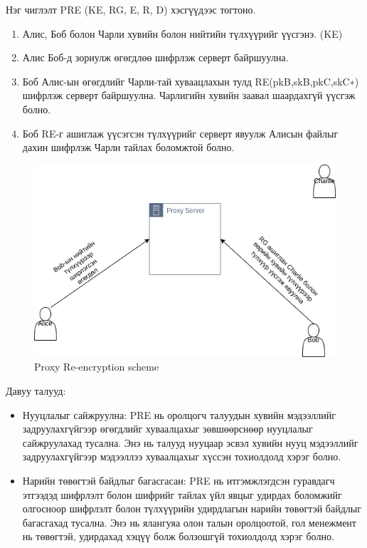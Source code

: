 Нэг чиглэлт PRE (KE, RG, E, R, D) хэсгүүдээс тогтоно.

\begin{enumerate}
    \item Алис, Боб болон Чарли хувийн болон нийтийн түлхүүрийг үүсгэнэ. (KE)
    \item Алис Боб-д зориулж өгөгдлөө шифрлэж серверт байршуулна.
    \item Боб Алис-ын өгөгдлийг Чарли-тай хуваацлахын тулд RE(pkB,skB,pkC,skC∗) шифрлэж серверт байршуулна. Чарлигийн хувийн заавал шаардахгүй үүсгэж болно.
    \item Боб RE-г ашиглаж үүсэгсэн түлхүүрийг серверт явуулж Алисын файлыг дахин шифрлэж Чарли тайлах боломжтой болно.
\end{enumerate}

\begin{figure}[ht]
\centering
\includegraphics[scale=0.5]{Figures/pre}
\caption[Proxy Re-encryption scheme]{Proxy Re-encryption scheme}
\label{fig:PRE_Scheme}
\end{figure}

Давуу талууд:
\begin{itemize}
    \item Нууцлалыг сайжруулна: PRE нь оролцогч талуудын хувийн мэдээллийг задруулахгүйгээр өгөгдлийг хуваалцахыг зөвшөөрснөөр нууцлалыг сайжруулахад тусална. Энэ нь талууд нууцаар эсвэл хувийн нууц мэдээллийг задруулахгүйгээр мэдээллээ хуваалцахыг хүссэн тохиолдолд хэрэг болно.
    \item Нарийн төвөгтэй байдлыг багасгасан: PRE нь итгэмжлэгдсэн гуравдагч этгээдэд шифрлэлт болон шифрийг тайлах үйл явцыг удирдах боломжийг олгосноор шифрлэлт болон түлхүүрийн удирдлагын нарийн төвөгтэй байдлыг багасгахад тусална. Энэ нь ялангуяа олон талын оролцоотой, гол менежмент нь төвөгтэй, удирдахад хэцүү болж болзошгүй тохиолдолд хэрэг болно.
\end{itemize}

